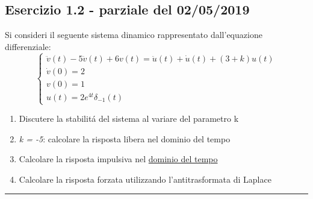 \documentclass[12pt,a4paper]{article}
\begin{document}
	\subsection*{Esercizio 1.2 - parziale del 02/05/2019}
	Si consideri il seguente sistema dinamico rappresentato dall'equazione differenziale:
	\[
		\begin{cases}
			\ddot{v}(t) -5\ddot{v}(t) + 6v(t) = \ddot{u}(t) + \dot{u}(t) + (3+k)u(t)\\
			\dot{v}(0) = 2\\
			v(0) = 1\\
			u(t) = 2e^{4t}\delta_{-1}(t)
		\end{cases}
	\]
	\begin{enumerate}
		\item Discutere la stabilit\'a del sistema al variare del parametro k
		\item \textit{k = -5}: calcolare la risposta libera nel dominio del tempo
		\item Calcolare la risposta impulsiva nel \underline{dominio del tempo}
		\item Calcolare la risposta forzata utilizzando l'antitrasformata di Laplace
	\end{enumerate}
	\par\noindent\rule{\textwidth}{0.4pt}
\end{document}
